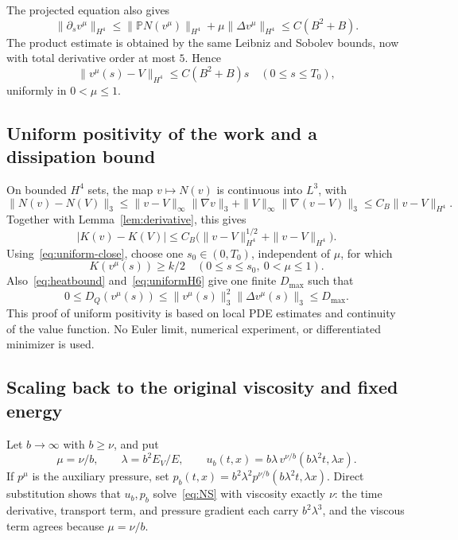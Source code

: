 \documentclass[11pt,a4paper]{article}
\theoremstyle{definition}
\newcommand{\PP}{\mathbb P}
\begin{document}
The projected equation also gives
\[
 \|\partial_s v^\mu\|_{H^4}
 \le\|\PP N(v^\mu)\|_{H^4}+\mu\|\Delta v^\mu\|_{H^4}
 \le C(B^2+B).
\]
The product estimate is obtained by the same Leibniz and Sobolev bounds, now with total derivative order at most $5$. Hence
\begin{equation}\label{eq:uniform-close}
 \|v^\mu(s)-V\|_{H^4}\le C(B^2+B)s
 \quad(0\le s\le T_0),
\end{equation}
uniformly in $0<\mu\le1$.

\subsection{Uniform positivity of the work and a dissipation bound}
On bounded $H^4$ sets, the map $v\mapsto N(v)$ is continuous into $L^3$, with
\[
 \|N(v)-N(V)\|_3
 \le\|v-V\|_\infty\|\nabla v\|_3
       +\|V\|_\infty\|\nabla(v-V)\|_3
 \le C_B\|v-V\|_{H^4}.
\]
Together with Lemma~\ref{lem:derivative}, this gives
\[
 |K(v)-K(V)|\le C_B\bigl(\|v-V\|_{H^4}^{1/2}
                               +\|v-V\|_{H^4}\bigr).
\]
Using~\eqref{eq:uniform-close}, choose one $s_0\in(0,T_0)$, independent of $\mu$, for which
\begin{equation}\label{eq:uniform-positive}
 K(v^\mu(s))\ge k/2\quad(0\le s\le s_0,\ 0<\mu\le1).
\end{equation}
Also~\eqref{eq:heatbound} and~\eqref{eq:uniformH6} give one finite $D_{\max}$ such that
\begin{equation}\label{eq:Dmax}
 0\le D_Q(v^\mu(s))
 \le\|v^\mu(s)\|_3^2\|\Delta v^\mu(s)\|_3\le D_{\max}.
\end{equation}
This proof of uniform positivity is based on local PDE estimates and continuity of the value function. No Euler limit, numerical experiment, or differentiated minimizer is used.

\subsection{Scaling back to the original viscosity and fixed energy}
Let $b\to\infty$ with $b\ge\nu$, and put
\begin{equation}\label{eq:aux-scale}
 \mu=\nu/b,\qquad \lambda=b^2E_V/E,\qquad
 u_b(t,x)=b\lambda\,v^{\nu/b}(b\lambda^2t,\lambda x).
\end{equation}
If $p^\mu$ is the auxiliary pressure, set
$p_b(t,x)=b^2\lambda^2p^{\nu/b}(b\lambda^2t,\lambda x)$. Direct substitution shows that $u_b,p_b$ solve~\eqref{eq:NS} with viscosity exactly $\nu$: the time derivative, transport term, and pressure gradient each carry $b^2\lambda^3$, and the viscous term agrees because $\mu=\nu/b$.
\end{document}
